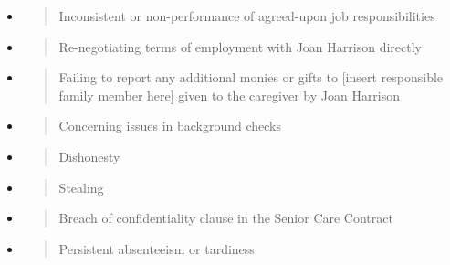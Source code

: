 \documentclass[]{article}
\begin{document}
\begin{itemize}
\item
  \begin{quote}
  Inconsistent or non-performance of agreed-upon job responsibilities
  \end{quote}
\end{itemize}

\begin{itemize}
\item
  \begin{quote}
  Re-negotiating terms of employment with Joan Harrison directly
  \end{quote}
\end{itemize}

\begin{itemize}
\item
  \begin{quote}
  Failing to report any additional monies or gifts to {[}insert
  responsible family member here{]} given to the caregiver by Joan
  Harrison
  \end{quote}
\end{itemize}

\begin{itemize}
\item
  \begin{quote}
  Concerning issues in background checks
  \end{quote}
\end{itemize}

\begin{itemize}
\item
  \begin{quote}
  Dishonesty
  \end{quote}
\end{itemize}

\begin{itemize}
\item
  \begin{quote}
  Stealing
  \end{quote}
\end{itemize}

\begin{itemize}
\item
  \begin{quote}
  Breach of confidentiality clause in the Senior Care Contract
  \end{quote}
\end{itemize}

\begin{itemize}
\item
  \begin{quote}
  Persistent absenteeism or tardiness
  \end{quote}
\end{itemize}
\end{document}
